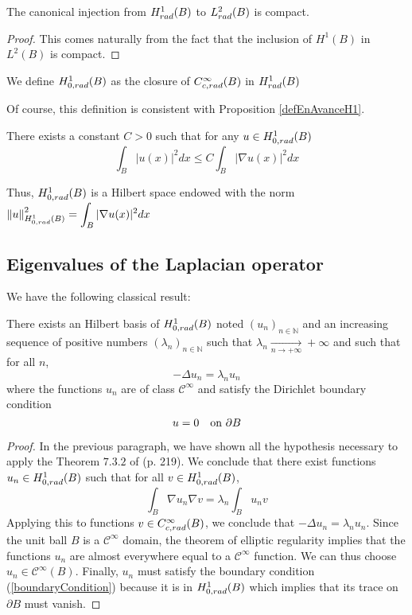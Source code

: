\documentclass[11pt,a4paper]{article}
\begin{document}
\begin{Prop} The canonical injection from $H^1_{rad}(B)$ to $L^2_{rad}(B)$ is compact. 
\begin{proof}
This comes naturally from the fact that the inclusion of $H^1(B)$ in $L^2(B)$ is compact. 
\end{proof}
\end{Prop}

\begin{Def} We define $H^1_{0,rad}(B)$ as the closure of $C^\infty_{c,rad}(B)$ in $H^1_{rad}(B)$
\end{Def}
Of course, this definition is consistent with Proposition \ref{defEnAvanceH1}. 
\begin{Prop} There exists a constant $C>0$ such that for any $u \in H^1_{0,rad}(B)$
\[  \int_{B} |u(x)|^2dx \leq C\int_{B} |\nabla u(x)|^2 dx\]
\end{Prop}
Thus, $H^1_{0,rad}(B)$ is a Hilbert space endowed with the norm $\left\|u\right\|^2_{H^1_{0,rad}(B)} = \displaystyle\int_{B}|\nabla u(x)|^2dx$

\subsection{Eigenvalues of the Laplacian operator}
\label{eigValsLaplace}
We have the following classical result:  
\begin{The} There exists an Hilbert basis of $H^1_{0,rad}(B)$ noted $(u_n)_{n\in \mathbb{N}}$ and an increasing sequence of positive numbers $(\lambda_n)_{n\in \mathbb{N}}$  such that $\lambda_n \underset{n \to +\infty}{\longrightarrow} +\infty$ and such that for all $n$, \[- \Delta u_n = \lambda_n u_n\] where the functions $u_n$ are of class $\mathcal{C}^{\infty}$ and satisfy the Dirichlet boundary condition 
\label{TheoAllaire}
\begin{equation}
u = 0 \quad \textup{on } \partial B
\label{boundaryCondition}
\end{equation}
\begin{proof}
In the previous paragraph, we have shown all the hypothesis necessary to apply the Theorem $7.3.2$ of \cite{allaire2005analyse} (p. 219). We conclude that there exist functions $u_n \in H^1_{0,rad}(B)$ such that for all $v \in H^1_{0,rad}(B)$, 
\begin{equation}
\int_{B} \nabla u_n  \nabla v = \lambda_n \int_{B} u_n v
\label{formVarLocal}
\end{equation}
Applying this to functions $v\in C^\infty_{c,rad}(B)$, we conclude that $-\Delta u_n = \lambda_n u_n$. Since the unit ball $B$ is a $\mathcal{C}^\infty$ domain, the theorem of elliptic regularity implies that the functions $u_n$ are almost everywhere equal to a $\mathcal{C}^\infty$ function. We can thus choose $u_n \in \mathcal{C}^\infty(B)$. Finally, $u_n$ must satisfy the boundary condition (\ref{boundaryCondition}) because it is in $H^1_{0,rad}(B)$ which implies that its trace on $\partial B$ must vanish. 
\end{proof}
\end{The}
\end{document}
